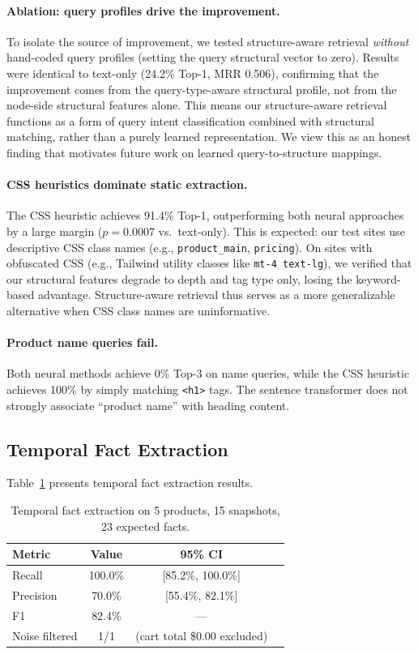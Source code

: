 \documentclass[11pt]{article}
\begin{document}
\paragraph{Ablation: query profiles drive the improvement.} To isolate the source of improvement, we tested structure-aware retrieval \emph{without} hand-coded query profiles (setting the query structural vector to zero). Results were identical to text-only (24.2\% Top-1, MRR 0.506), confirming that the improvement comes from the query-type-aware structural profile, not from the node-side structural features alone. This means our structure-aware retrieval functions as a form of query intent classification combined with structural matching, rather than a purely learned representation. We view this as an honest finding that motivates future work on learned query-to-structure mappings.

\paragraph{CSS heuristics dominate static extraction.} The CSS heuristic achieves 91.4\% Top-1, outperforming both neural approaches by a large margin ($p = 0.0007$ vs.\ text-only). This is expected: our test sites use descriptive CSS class names (e.g., \texttt{product\_main}, \texttt{pricing}). On sites with obfuscated CSS (e.g., Tailwind utility classes like \texttt{mt-4 text-lg}), we verified that our structural features degrade to depth and tag type only, losing the keyword-based advantage. Structure-aware retrieval thus serves as a more generalizable alternative when CSS class names are uninformative.

\paragraph{Product name queries fail.} Both neural methods achieve 0\% Top-3 on name queries, while the CSS heuristic achieves 100\% by simply matching \texttt{<h1>} tags. The sentence transformer does not strongly associate ``product name'' with heading content.

\subsection{Temporal Fact Extraction}

Table~\ref{tab:temporal} presents temporal fact extraction results.

\begin{table}[t]
\centering
\caption{Temporal fact extraction on 5 products, 15 snapshots, 23 expected facts.}
\label{tab:temporal}
\begin{tabular}{lccc}
\toprule
\textbf{Metric} & \textbf{Value} & \textbf{95\% CI} \\
\midrule
Recall & 100.0\% & [85.2\%, 100.0\%] \\
Precision & 70.0\% & [55.4\%, 82.1\%] \\
F1 & 82.4\% & --- \\
\midrule
Noise filtered & 1/1 & (cart total \$0.00 excluded) \\
\bottomrule
\end{tabular}
\end{table}
\end{document}
